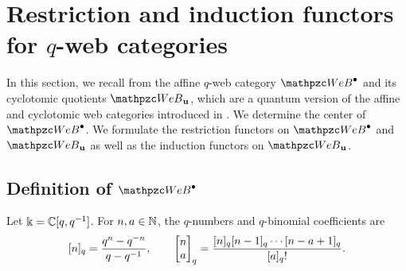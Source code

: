 \section{Restriction and induction functors for $q$-web categories}
\label{sec:web}

In this section, we recall from \cite{SSW25} the affine $q$-web category $\qAW$ and its cyclotomic quotients $\qW_\bfu$, which are a quantum version of the affine and cyclotomic web categories introduced in \cite{SW25web}. We determine the center of $\qAW$. We formulate the restriction functors on $\qAW$ and $\qW_\bfu$ as well as the induction functors on $\qW_\bfu$. 


\subsection{Definition of $\qAW$}

Let $\Bbbk =\mathbb{C}[q,q^{-1}]$.
For $n, a \in \mathbb{N}$, the $ q$-numbers and $q$-binomial coefficients are
\begin{align}
\label{qbinom}
    [n]_q =\frac{q^n -q^{-n}}{q-q^{-1}},
    \qquad
    \begin{bmatrix} n\\a \end{bmatrix}_q =\frac{[n]_q[n-1]_q\cdots [n-a+1]_q}{[a]_q!}.
\end{align}

